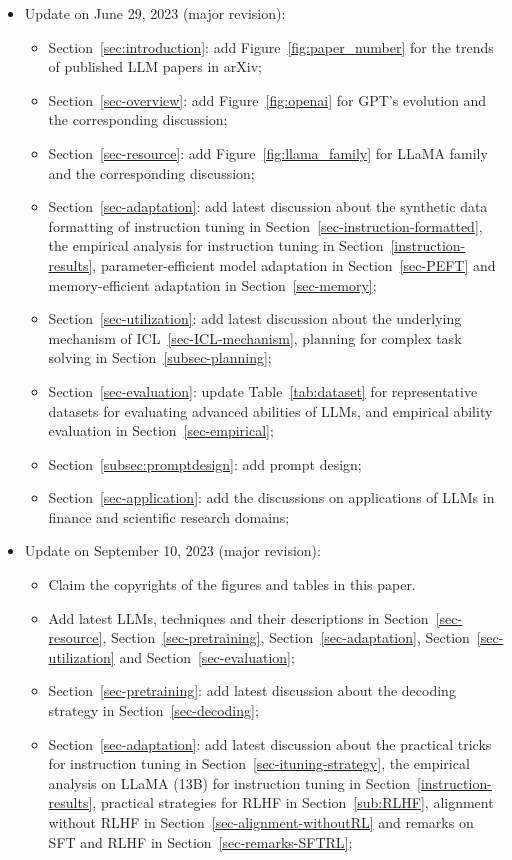 {\begin{itemize}
\item {Update on June 29, 2023 (major revision): }
\begin{itemize}
\item Section~\ref{sec:introduction}: add Figure~\ref{fig:paper_number} for the trends of published LLM papers in arXiv;
\item  Section~\ref{sec-overview}: add  Figure~\ref{fig:openai} for GPT's evolution and the corresponding discussion;
\item  Section~\ref{sec-resource}: add Figure~\ref{fig:llama_family} for LLaMA family and the corresponding discussion;
\item  Section~\ref{sec-adaptation}: add latest discussion about the synthetic data formatting of instruction tuning in Section~\ref{sec-instruction-formatted},  the empirical analysis for instruction tuning in Section~\ref{instruction-results},   parameter-efficient model adaptation in Section~\ref{sec-PEFT} and memory-efficient adaptation in Section~\ref{sec-memory};
\item Section~\ref{sec-utilization}: add latest discussion about the underlying mechanism of ICL~\ref{sec-ICL-mechanism},  planning for complex task solving in Section~\ref{subsec-planning};
\item Section~\ref{sec-evaluation}: update Table~\ref{tab:dataset} for representative datasets for evaluating advanced abilities of LLMs, and empirical ability evaluation in Section~\ref{sec-empirical};
\item  Section~\ref{subsec:promptdesign}: add prompt design;%
\item  Section~\ref{sec-application}: add the discussions on applications of LLMs in finance and scientific research domains;
\end{itemize}
\item {Update on September 10, 2023 (major revision): }
\begin{itemize}
\item 
{Claim the copyrights of the figures and tables in this paper.}
\item %
{Add latest LLMs, techniques and their descriptions in Section~\ref{sec-resource}, Section~\ref{sec-pretraining}, Section~\ref{sec-adaptation}, Section~\ref{sec-utilization} and Section~\ref{sec-evaluation};}
\item {Section~\ref{sec-pretraining}: add latest discussion about the decoding strategy in Section~\ref{sec-decoding};}
\item {Section~\ref{sec-adaptation}: add latest discussion about the practical tricks for instruction tuning in Section~\ref{sec-ituning-strategy}, the empirical analysis on LLaMA (13B) for instruction tuning in Section~\ref{instruction-results}, practical strategies for RLHF in Section~\ref{sub:RLHF},  alignment without RLHF in Section~\ref{sec-alignment-withoutRL} and remarks on SFT and RLHF in Section~\ref{sec-remarks-SFTRL};}

\end{itemize}
\end{itemize}}

